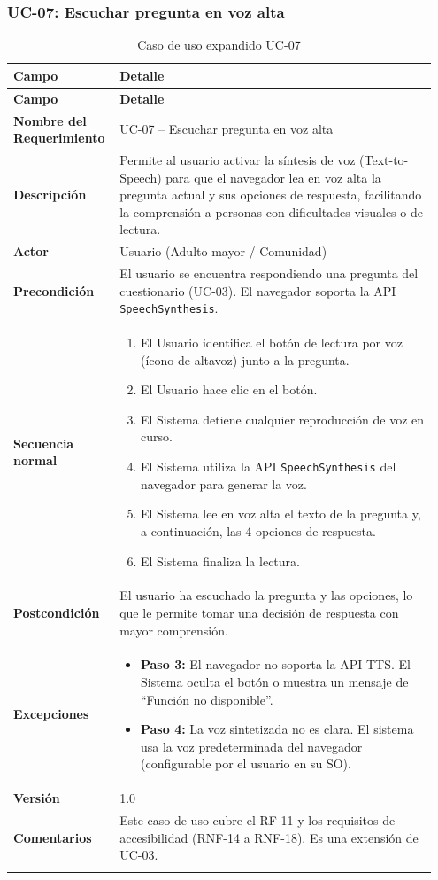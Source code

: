 \subsubsection{UC-07: Escuchar pregunta en voz alta}

\begin{longtable}{p{0.22\linewidth} p{0.73\linewidth}}
\toprule
\rowcolor{tableheader!20}
\textbf{Campo} & \textbf{Detalle} \\
\midrule
\endfirsthead
\rowcolor{tableheader!20}
\textbf{Campo} & \textbf{Detalle} \\
\midrule
\endhead
\bottomrule
\endfoot
\textbf{Nombre del Requerimiento} & UC-07 -- Escuchar pregunta en voz alta \\
\textbf{Descripción} & Permite al usuario activar la síntesis de voz (Text-to-Speech) para que el navegador lea en voz alta la pregunta actual y sus opciones de respuesta, facilitando la comprensión a personas con dificultades visuales o de lectura. \\
\textbf{Actor} & Usuario (Adulto mayor / Comunidad) \\
\textbf{Precondición} & El usuario se encuentra respondiendo una pregunta del cuestionario (UC-03). El navegador soporta la API \texttt{SpeechSynthesis}. \\
\textbf{Secuencia normal} & 
  \begin{enumerate}
    \item El Usuario identifica el botón de lectura por voz (ícono de altavoz) junto a la pregunta.
    \item El Usuario hace clic en el botón.
    \item El Sistema detiene cualquier reproducción de voz en curso.
    \item El Sistema utiliza la API \texttt{SpeechSynthesis} del navegador para generar la voz.
    \item El Sistema lee en voz alta el texto de la pregunta y, a continuación, las 4 opciones de respuesta.
    \item El Sistema finaliza la lectura.
  \end{enumerate} \\
\textbf{Postcondición} & El usuario ha escuchado la pregunta y las opciones, lo que le permite tomar una decisión de respuesta con mayor comprensión. \\
\textbf{Excepciones} & 
  \begin{itemize}
    \item \textbf{Paso 3:} El navegador no soporta la API TTS. El Sistema oculta el botón o muestra un mensaje de ``Función no disponible''.
    \item \textbf{Paso 4:} La voz sintetizada no es clara. El sistema usa la voz predeterminada del navegador (configurable por el usuario en su SO).
  \end{itemize} \\
\textbf{Versión} & 1.0 \\
\textbf{Comentarios} & Este caso de uso cubre el RF-11 y los requisitos de accesibilidad (RNF-14 a RNF-18). Es una extensión de UC-03. \\
\bottomrule
\caption{Caso de uso expandido UC-07}
\label{tab:uc07}
\end{longtable}

